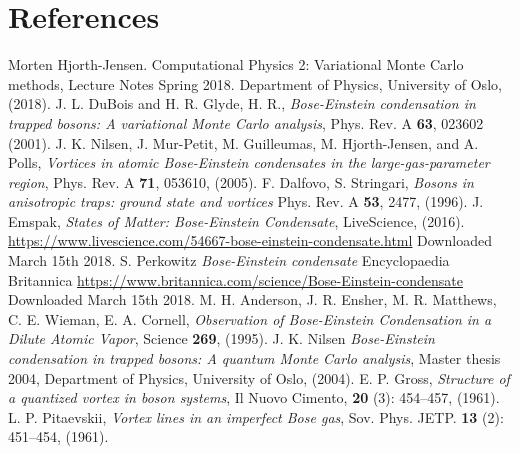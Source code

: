 \documentclass[norsk,a4paper,12pt]{article}
\begin{document}
\section{References}
\begingroup
\renewcommand{\section}[2]{}
\begin{thebibliography}{}
	Morten Hjorth-Jensen.
	Computational Physics 2: Variational Monte Carlo methods, Lecture Notes Spring 2018.
	Department of Physics, University of Oslo,
	(2018).
	J. L. DuBois and H. R. Glyde, H. R., \emph{Bose-Einstein condensation in trapped bosons: A variational Monte Carlo analysis}, Phys. Rev. A \textbf{63}, 023602 (2001).
	J. K. Nilsen,  J. Mur-Petit, M. Guilleumas, M. Hjorth-Jensen, and A. Polls, \emph{Vortices in atomic Bose-Einstein condensates in the large-gas-parameter region}, Phys. Rev. A \textbf{71}, 053610, (2005).
	F. Dalfovo, S. Stringari, \emph{Bosons in anisotropic traps: ground state and vortices} Phys. Rev. A \textbf{53}, 2477, (1996).
	J. Emspak, \emph{States of Matter: Bose-Einstein Condensate}, LiveScience, (2016).
	\url{https://www.livescience.com/54667-bose-einstein-condensate.html}
	Downloaded March 15th 2018.
	S. Perkowitz \emph{Bose-Einstein condensate} Encyclopaedia Britannica 
	\url{https://www.britannica.com/science/Bose-Einstein-condensate}
	Downloaded March 15th 2018.
	M. H. Anderson, J. R. Ensher, M. R. Matthews, C. E. Wieman, E. A. Cornell, \emph{Observation of Bose-Einstein Condensation in a Dilute Atomic Vapor}, Science \textbf{269}, (1995).
	J. K. Nilsen \emph{Bose-Einstein condensation in trapped bosons: A quantum Monte Carlo analysis}, Master thesis 2004, Department of Physics, University of Oslo, (2004). 
	E. P. Gross, \emph{Structure of a quantized vortex in boson systems}, Il Nuovo Cimento, \textbf{20} (3): 454–457, (1961).
	L. P. Pitaevskii, \emph{Vortex lines in an imperfect Bose gas}, Sov. Phys. JETP. \textbf{13} (2): 451–454, (1961).
	
	
\end{thebibliography}
\endgroup
\end{document}
